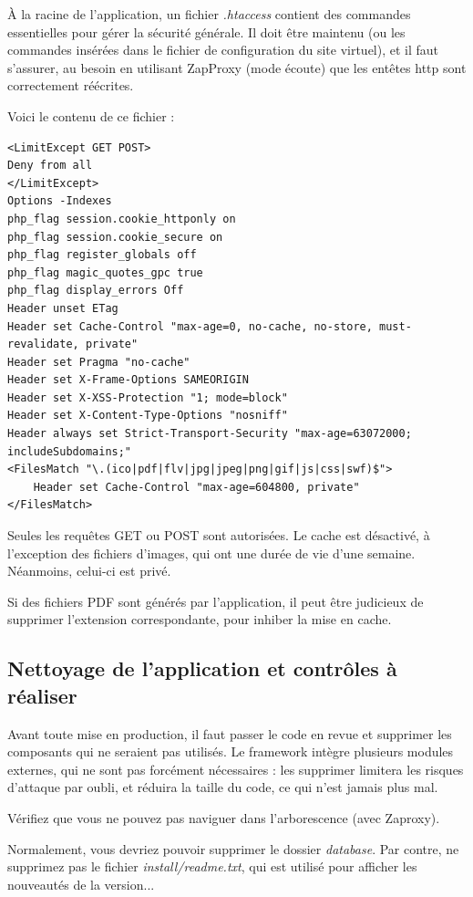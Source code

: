 À la racine de l'application, un fichier \textit{.htaccess} contient des commandes essentielles pour gérer la sécurité générale. Il doit être maintenu (ou les commandes insérées dans le fichier de configuration du site virtuel), et il faut s'assurer, au besoin en utilisant ZapProxy (mode écoute) que les entêtes http sont correctement réécrites.

Voici le contenu de ce fichier :
\begin{lstlisting}
<LimitExcept GET POST>
Deny from all
</LimitExcept>
Options -Indexes
php_flag session.cookie_httponly on
php_flag session.cookie_secure on
php_flag register_globals off
php_flag magic_quotes_gpc true
php_flag display_errors Off
Header unset ETag
Header set Cache-Control "max-age=0, no-cache, no-store, must-revalidate, private"
Header set Pragma "no-cache"
Header set X-Frame-Options SAMEORIGIN
Header set X-XSS-Protection "1; mode=block"
Header set X-Content-Type-Options "nosniff"
Header always set Strict-Transport-Security "max-age=63072000; includeSubdomains;"
<FilesMatch "\.(ico|pdf|flv|jpg|jpeg|png|gif|js|css|swf)$">
    Header set Cache-Control "max-age=604800, private"
</FilesMatch>

\end{lstlisting}

Seules les requêtes GET ou POST sont autorisées. Le cache est désactivé, à l'exception des fichiers d'images, qui ont une durée de vie d'une semaine. Néanmoins, celui-ci est privé.

Si des fichiers PDF sont générés par l'application, il peut être judicieux de supprimer l'extension correspondante, pour inhiber la mise en cache.

\subsection{Nettoyage de l'application et contrôles à réaliser}

Avant toute mise en production, il faut passer le code en revue et supprimer les composants qui ne seraient pas utilisés. Le framework intègre plusieurs modules externes, qui ne sont pas forcément nécessaires : les supprimer limitera les risques d'attaque par oubli, et réduira la taille du code, ce qui n'est jamais plus mal.

Vérifiez que vous ne pouvez pas naviguer dans l'arborescence (avec Zaproxy).

Normalement, vous devriez pouvoir supprimer le dossier \textit{database}. Par contre, ne supprimez pas le fichier \textit{install/readme.txt}, qui est utilisé pour afficher les nouveautés de la version...

